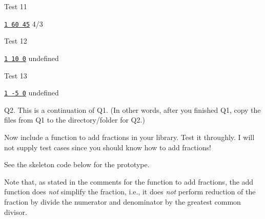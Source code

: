 Test 11
\begin{console}[commandchars=\\\{\}]
\underline{\texttt{1 60 45}}
4/3
\end{console}

Test 12
\begin{console}[commandchars=\\\{\}]
\underline{\texttt{1 10 0}}
undefined
\end{console}

Test 13
\begin{console}[commandchars=\\\{\}]
\underline{\texttt{1 -5 0}}
undefined
\end{console}


\newpage
Q2. This is a continuation of Q1.
(In other words, after you finished Q1, copy the files from Q1
to the directory/folder for Q2.)

Now include a function to add fractions in your library.
Test it throughly.
I will not supply test cases since you should know how to add fractions!

See the skeleton code below for the prototype.

Note that, as stated in the comments for the function to add fractions,
the add function does \textit{not} simplify the fraction, i.e.,
it does \textit{not} perform reduction of the fraction
by divide the numerator and denominator by the greatest common divisor.

